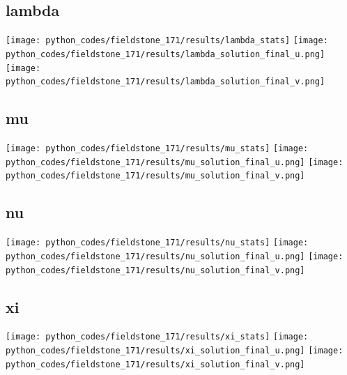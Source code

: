 \subsection*{lambda}
\begin{center}
\texttt{[image: python\_codes/fieldstone\_171/results/lambda\_stats]}
\texttt{[image: python\_codes/fieldstone\_171/results/lambda\_solution\_final\_u.png]}
\texttt{[image: python\_codes/fieldstone\_171/results/lambda\_solution\_final\_v.png]}
\end{center}

\subsection*{mu}
\begin{center}
\texttt{[image: python\_codes/fieldstone\_171/results/mu\_stats]}
\texttt{[image: python\_codes/fieldstone\_171/results/mu\_solution\_final\_u.png]}
\texttt{[image: python\_codes/fieldstone\_171/results/mu\_solution\_final\_v.png]}
\end{center}

\subsection*{nu}
\begin{center}
\texttt{[image: python\_codes/fieldstone\_171/results/nu\_stats]}
\texttt{[image: python\_codes/fieldstone\_171/results/nu\_solution\_final\_u.png]}
\texttt{[image: python\_codes/fieldstone\_171/results/nu\_solution\_final\_v.png]}
\end{center}

\subsection*{xi}
\begin{center}
\texttt{[image: python\_codes/fieldstone\_171/results/xi\_stats]}
\texttt{[image: python\_codes/fieldstone\_171/results/xi\_solution\_final\_u.png]}
\texttt{[image: python\_codes/fieldstone\_171/results/xi\_solution\_final\_v.png]}
\end{center}

